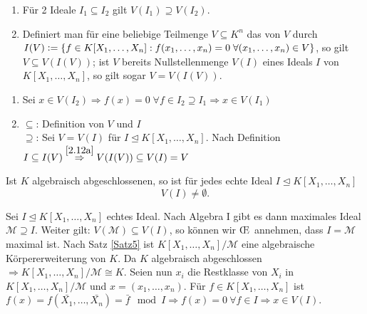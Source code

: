 \documentclass[a4paper, 10pt]{report}
\begin{document}
\begin{BemDef}
  \begin{enumerate}
    \item \label{2.12a}Für 2 Ideale $I_1 \subseteq I_2$ gilt $V(I_1) \supseteq V(I_2)$.
    \item Definiert man für eine beliebige Teilmenge $V \subseteq K^n$ das                                          von $V$ durch $I(V) \mathrel{\mathop:}= \{ f \in K[X_1,         \dots, X_n]: f(x_1, \dots, x_n) = 0 \; \forall (x_1, \dots, x_n) \in V\}$, so gilt $V \subseteq          V(I(V))$; ist $V$ bereits Nullstellenmenge $V(I)$ eines Ideals $I$ von $K[X_1, \dots, X_n]$, so          gilt sogar $V = V(I(V))$.
  \end{enumerate}
\end{BemDef}

\begin{Bew}
  \begin{enumerate}
    \item Sei $x \in V(I_2) \Rightarrow f(x) = 0 \; \forall f \in I_2 \supseteq I_1 \Rightarrow x \in V(I_1)$
    \item \glqq$\subseteq$\grqq: Definition von $V$ und $I$\\
          \glqq$\supseteq$\grqq: Sei $V = V(I)$ für $I \trianglelefteq K[X_1, \dots, X_n]$.
	  Nach Definition $I \subseteq I(V) \overset{\ref{2.12a}}{\Rightarrow} V(I(V)) \subseteq V(I) = V$
  \end{enumerate}
\end{Bew}

\begin{nnSatz}
\label{SatzSchwach}
  Ist $K$ algebraisch abgeschlossenen, so ist für jedes echte Ideal $I \trianglelefteq K[X_1, \dots, X_n]$
   \[
   V(I) \not= \emptyset.
   \]
\end{nnSatz}

\begin{Bew}
  Sei $I \trianglelefteq K[X_1, \dots, X_n]$ echtes Ideal. Nach Algebra I gibt es dann maximales Ideal $\mathcal{M} \supseteq I$. Weiter gilt: $V(\mathcal{M}) \subseteq V(I)$, so können wir \OE\ annehmen, dass $I = \mathcal{M}$ maximal ist.
  Nach Satz \ref{Satz5} ist $K[X_1, \dots, X_n]/\mathcal{M}$ eine algebraische Körpererweiterung von $K$.
  Da $K$ algebraisch abgeschlossen $\Rightarrow K[X_1, \dots, X_n]/\mathcal{M} \cong K$.
  Seien nun $x_i$ die Restklasse von $X_i$ in $K[X_1, \dots, X_n]/\mathcal{M}$ und $x = (x_1, \dots, x_n)$.
  Für $f \in K[X_1, \dots, X_n]$ ist $f(x) = f(\bar{X_1}, \dots, \bar{X_n}) = \bar{f} \mod I \Rightarrow f(x) = 0\ \forall f \in I \Rightarrow x \in V(I)$.
\end{Bew}
\end{document}
